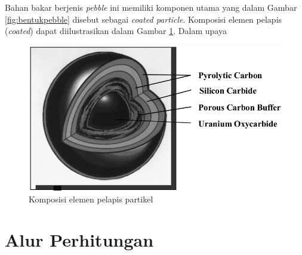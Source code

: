 \documentclass[a4paper,11pt]{report}
\begin{document}
Bahan bakar berjenis \textit{pebble} ini memiliki komponen utama yang dalam Gambar \ref{fig:bentukpebble} disebut sebagai \textit{coated particle}. Komposisi elemen pelapis (\textit{coated}) dapat diilustrasikan dalam Gambar \ref{fig:pelapis}. Dalam upaya 

\begin{figure}[h]
  \centering
  \includegraphics[scale=.5]{pics/triso.png}
  \caption[Komposisi elemen pelapis partikel]{Komposisi elemen pelapis partikel \cite{wang2004integrated}}
  \label{fig:pelapis}
\end{figure}

\chapter{Alur Perhitungan}
\end{document}
